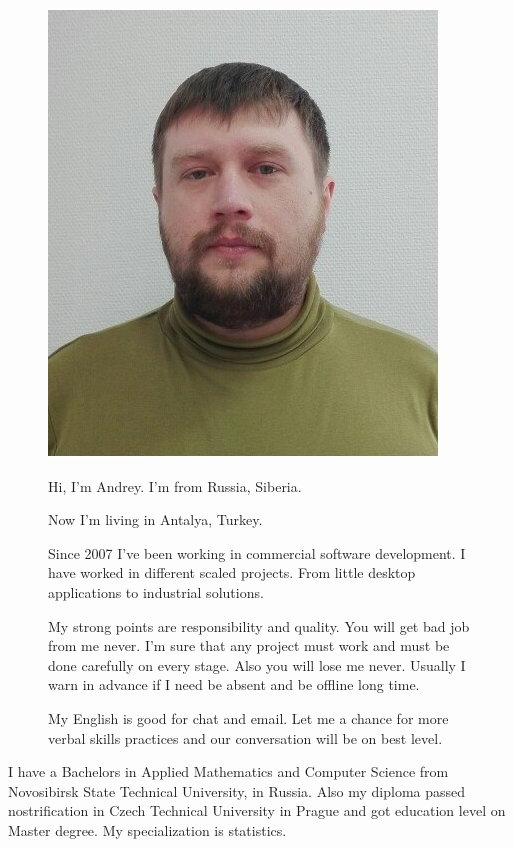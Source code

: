 \documentclass[letterpaper,11pt]{article}
\begin{document}
\begin{figure}[h!]
  \begin{minipage}[h!]{.2\textwidth}
    \includegraphics[scale=0.25]{AndreiShestakov0.png}
  \end{minipage}
  \hfil
  \begin{minipage}[h!]{0.8\textwidth}

Hi, I'm Andrey. I'm from Russia, Siberia.

Now I'm living in Antalya, Turkey.

Since 2007 I've been working in commercial software development. I have worked in different scaled projects. From little desktop applications to industrial solutions.

My strong points are responsibility and quality. You will get bad job from me never. I'm sure that any project must work and must be done carefully on every stage. Also you will lose me never. Usually I warn in advance if I need be absent and be offline long time.

My English is good for chat and email. Let me a chance for more verbal skills practices and our conversation will be on best level.
  \end{minipage}
\end{figure}

I have a Bachelors in Applied Mathematics and Computer Science from Novosibirsk State Technical University, in Russia. Also my diploma passed nostrification in Czech Technical University in Prague and got education level on Master degree. My specialization is statistics.
\end{document}
